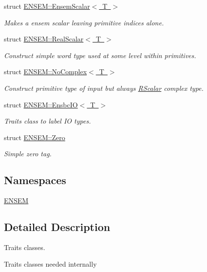 \begin{DoxyCompactItemize}
struct \mbox{\hyperlink{structENSEM_1_1EnsemScalar}{E\+N\+S\+E\+M\+::\+Ensem\+Scalar$<$ T $>$}}
\begin{DoxyCompactList}\small\item\em Makes a ensem scalar leaving primitive indices alone. \end{DoxyCompactList}\item 
struct \mbox{\hyperlink{structENSEM_1_1RealScalar}{E\+N\+S\+E\+M\+::\+Real\+Scalar$<$ T $>$}}
\begin{DoxyCompactList}\small\item\em Construct simple word type used at some level within primitives. \end{DoxyCompactList}\item 
struct \mbox{\hyperlink{structENSEM_1_1NoComplex}{E\+N\+S\+E\+M\+::\+No\+Complex$<$ T $>$}}
\begin{DoxyCompactList}\small\item\em Construct primitive type of input but always \mbox{\hyperlink{classENSEM_1_1RScalar}{R\+Scalar}} complex type. \end{DoxyCompactList}\item 
struct \mbox{\hyperlink{structENSEM_1_1EnsbcIO}{E\+N\+S\+E\+M\+::\+Ensbc\+I\+O$<$ T $>$}}
\begin{DoxyCompactList}\small\item\em Traits class to label IO types. \end{DoxyCompactList}\item 
struct \mbox{\hyperlink{structENSEM_1_1Zero}{E\+N\+S\+E\+M\+::\+Zero}}
\begin{DoxyCompactList}\small\item\em Simple zero tag. \end{DoxyCompactList}\end{DoxyCompactItemize}
\subsection*{Namespaces}
\begin{DoxyCompactItemize}
\item 
 \mbox{\hyperlink{namespaceENSEM}{E\+N\+S\+EM}}
\end{DoxyCompactItemize}


\subsection{Detailed Description}
Traits classes. 

Traits classes needed internally 